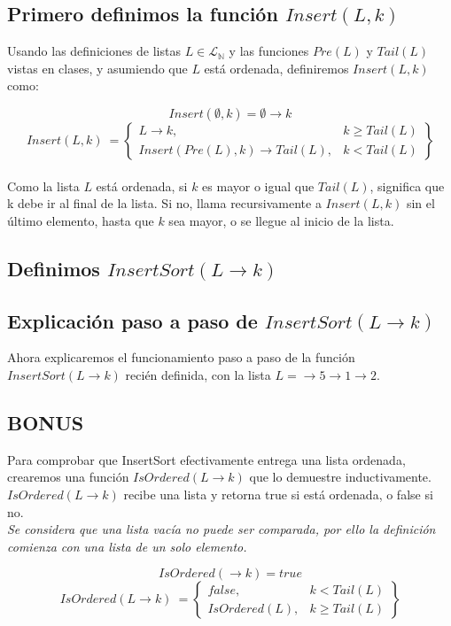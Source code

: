 \documentclass[../doc.tex]{subfiles}
\begin{document}
\subsection{Primero definimos la función $Insert(L,k)$}
Usando las definiciones de listas $L \in \mathcal{L}_\mathbb{N}$ y las funciones $Pre(L)$ y $Tail(L)$ vistas en clases, y asumiendo que $L$ está ordenada, definiremos $Insert(L,k)$ como:

\[Insert(\emptyset,k) = \emptyset \rightarrow k\]
\[Insert(L,k)\ = \left\{\begin{array}{lr}
  L \rightarrow k, & k \ge Tail(L)\\
  Insert(Pre(L),k) \rightarrow Tail(L), & k < Tail(L)
\end{array}\right\}\]\\

Como la lista $L$ está ordenada, si $k$ es mayor o igual que $Tail(L)$, significa que k debe ir al final de la lista. Si no, llama recursivamente a $Insert(L,k)$ sin el último elemento, hasta que $k$ sea mayor, o se llegue al inicio de la lista.

\subsection{Definimos $InsertSort(L \rightarrow k)$}

\subsection{Explicación paso a paso de $InsertSort(L \rightarrow k)$}
Ahora explicaremos el funcionamiento paso a paso de la función $InsertSort(L \rightarrow k)$ recién definida, con la lista $L = \rightarrow 5 \rightarrow 1 \rightarrow 2$. 
\subsection{BONUS}
Para comprobar que InsertSort efectivamente entrega una lista ordenada, crearemos una función $IsOrdered(L \rightarrow k)$ que lo demuestre inductivamente.
$IsOrdered(L \rightarrow k)$ recibe una lista y retorna true si está ordenada, o false si no.\\

\emph{Se considera que una lista vacía no puede ser comparada, por ello la definición comienza con una lista de un solo elemento.}

\[IsOrdered(\rightarrow k) = true \]
\[IsOrdered(L \rightarrow k)\ = \left\{\begin{array}{lr}
  false, & k < Tail(L)\\
  IsOrdered(L), & k \ge Tail(L)
\end{array}\right\}\]\\
\end{document}
